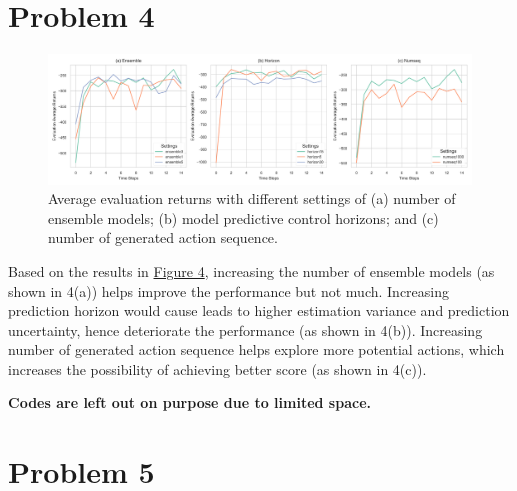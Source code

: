 \documentclass[10pt, letterpaper]{article}
\begin{document}
\pagebreak
\section*{Problem 4}

\begin{figure}[thbp]
    \centering
    \includegraphics[width=\textwidth]{q4.png}
    \caption{Average evaluation returns with different settings of (a) number of ensemble models; (b) model predictive control horizons; and (c) number of generated action sequence.}
    \label{fig: 4}
\end{figure}

Based on the results in \hyperref[fig: 4]{Figure 4}, increasing the number of ensemble models (as shown in 4(a)) helps improve the performance but not much. Increasing prediction horizon would cause leads to higher estimation variance and prediction uncertainty, hence deteriorate the performance (as shown in 4(b)). Increasing number of generated action sequence helps explore more potential actions, which increases the possibility of achieving better score (as shown in 4(c)). 

\textbf{Codes are left out on purpose due to limited space.}

\pagebreak
\section*{Problem 5}
\end{document}
